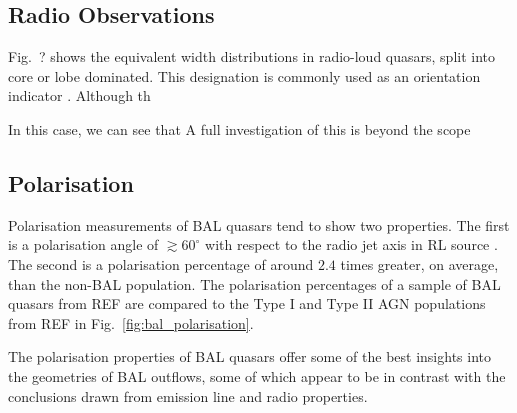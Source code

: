 
\subsection{Radio Observations}

Fig.~? shows the equivalent width distributions in radio-loud quasars, 
split into core or lobe dominated. This designation is commonly used
as an orientation indicator \citep{orr1982,wills1995}. 
Although th

In this case, we can see that 
A full investigation of this is beyond the scope 



\subsection{Polarisation}

Polarisation measurements of BAL quasars tend to show two properties.
The first is a polarisation angle of $\gtrsim60^\circ$ with respect
to the radio jet axis in RL source \citep{brotherton2006}. The second
is a polarisation percentage of around $2.4$ times greater, 
on average, than the 
non-BAL population. The polarisation percentages of a sample 
of BAL quasars from REF
are compared to the Type I and Type II AGN populations from REF in 
Fig.~\ref{fig:bal_polarisation}.

The polarisation properties of BAL quasars offer some of
the best insights into the geometries of BAL outflows, some of which
appear to be in contrast with the conclusions drawn from emission
line and radio properties. 

